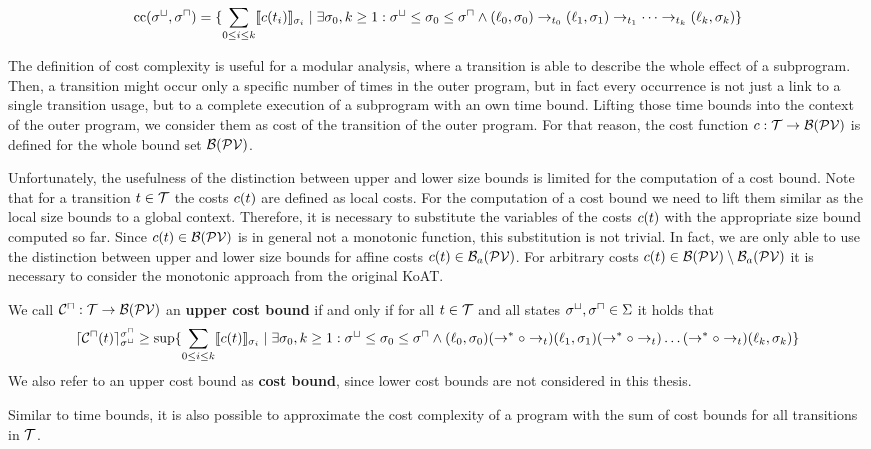 \begin{definition}
\[ \text{cc}({\sigma^\sqcup}, {\sigma^\sqcap}) = \lbrace  \sum_{0 \leq i \leq k} \llbracket c(t_i) \rrbracket_{\sigma_i} \mid \exists \sigma_0, k \geq 1: {\sigma^\sqcup} \leq \sigma_0 \leq {\sigma^\sqcap} \wedge (\ell_0, \sigma_0) \rightarrow_{t_0} (\ell_1, \sigma_1) \rightarrow_{t_1} \dots \rightarrow_{t_k} (\ell_k, \sigma_k)  \rbrace \]
\end{definition}

The definition of cost complexity is useful for a modular analysis, where a transition is able to describe the whole effect of a subprogram.
Then, a transition might occur only a specific number of times in the outer program, but in fact every occurrence is not just a link to a single transition usage, but to a complete execution of a subprogram with an own time bound.
Lifting those time bounds into the context of the outer program, we consider them as cost of the transition of the outer program. 
For that reason, the cost function $c: \mathcal{T} \rightarrow \mathcal{B}(\mathcal{PV})$ is defined for the whole bound set $\mathcal{B}(\mathcal{PV})$.

Unfortunately, the usefulness of the distinction between upper and lower size bounds is limited for the computation of a cost bound.
Note that for a transition $t \in \mathcal{T}$ the costs $c(t)$ are defined as local costs.
For the computation of a cost bound we need to lift them similar as the local size bounds to a global context.
Therefore, it is necessary to substitute the variables of the costs $c(t)$ with the appropriate size bound computed so far.
Since $c(t) \in \mathcal{B}(\mathcal{PV})$ is in general not a monotonic function, this substitution is not trivial.
In fact, we are only able to use the distinction between upper and lower size bounds for affine costs $c(t) \in \mathcal{B}_a(\mathcal{PV})$.
For arbitrary costs $c(t) \in \mathcal{B}(\mathcal{PV}) \setminus \mathcal{B}_a(\mathcal{PV})$ it is necessary to consider the monotonic approach from the original KoAT.

\begin{definition}
  We call ${\mathcal{C}^\sqcap}: \mathcal{T} \rightarrow \mathcal{B}(\mathcal{PV})$ an \textbf{upper cost bound} if and only if for all $t \in \mathcal{T}$ and all states ${\sigma^\sqcup}, {\sigma^\sqcap} \in \Sigma$ it holds that
  \[ \lceil {\mathcal{C}^\sqcap}(t) \rceil^{{\sigma^\sqcap}}_{{\sigma^\sqcup}} \geq \sup \lbrace  \sum_{0 \leq i \leq k} \llbracket c(t) \rrbracket_{\sigma_i} \mid \exists \sigma_0, k \geq 1: {\sigma^\sqcup} \leq \sigma_0 \leq {\sigma^\sqcap} \wedge (\ell_0, \sigma_0) (\rightarrow^* \circ \rightarrow_t) (\ell_1, \sigma_1) (\rightarrow^* \circ \rightarrow_t) \dots (\rightarrow^* \circ \rightarrow_t) (\ell_k, \sigma_k)  \rbrace \]
  We also refer to an upper cost bound as \textbf{cost bound}, since lower cost bounds are not considered in this thesis.
\end{definition}

Similar to time bounds, it is also possible to approximate the cost complexity of a program with the sum of cost bounds for all transitions in $\mathcal{T}$.


